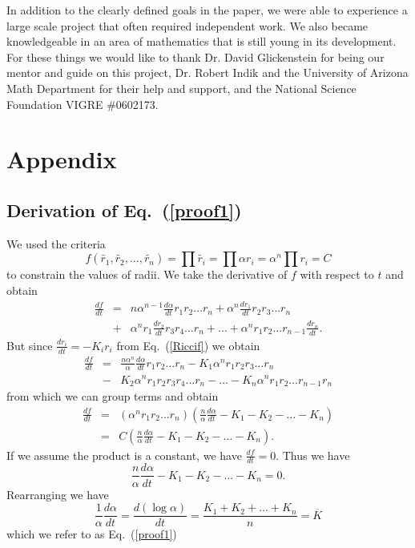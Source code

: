 \documentclass[12pt]{article}
\begin{document}
\noindent In addition to the clearly defined goals in the paper, we were able to experience a large scale project that often required independent work. We also became knowledgeable in an area of mathematics that is still young in its development. For these things we would like to thank Dr. David Glickenstein for being our mentor and guide on this project, Dr. Robert Indik and the University of Arizona Math Department for their help and support, and the National Science Foundation VIGRE $\#$0602173.

\newpage
  


\newpage
\section{Appendix}

\subsection{Derivation of Eq.~(\ref{proof1})}
\maketitle
	
	We used the criteria $$f(\tilde{r_1},\tilde{r_2},\ldots,\tilde{r_n}) = \prod{\tilde{r_i}} = \prod{\alpha r_i} = \alpha^n\prod{r_i}= C$$ to constrain the values of radii. We take the derivative of $f$ with respect to $t$ and obtain
	\begin{eqnarray*}
	\frac{df}{dt} & = & n\alpha^{n-1}\frac{d\alpha}{dt}r_1r_2\ldots r_n + \alpha^n\frac{dr_1}{dt}r_2r_3\ldots r_n\\
								& + & \alpha^nr_1\frac{dr_2}{dt}r_3r_4\ldots r_n + \ldots + \alpha^nr_1r_2\ldots r_{n-1}\frac{dr_n}{dt}.
	\end{eqnarray*}
	But since $\displaystyle \frac{dr_i}{dt} = -K_ir_i$ from Eq.~(\ref{Riccif}) we obtain
	\begin{eqnarray*}
	\frac{df}{dt} & = & \frac{n\alpha^{n}}{\alpha}\frac{d\alpha}{dt}r_1r_2\ldots r_n - K_1\alpha^nr_1r_2r_3\ldots r_n\\
								& - & K_2\alpha^nr_1r_2r_3r_4\ldots r_n - \ldots - K_n\alpha^nr_1r_2\ldots r_{n-1}r_n
	\end{eqnarray*}
	from which we can group terms and obtain
	\begin{eqnarray*}
	\frac{df}{dt} & = & (\alpha^nr_1r_2\ldots r_n)(\frac{n}{\alpha}\frac{d\alpha}{dt} - K_1 - K_2 - \ldots - K_n)\\
								& = & C(\frac{n}{\alpha}\frac{d\alpha}{dt} - K_1 - K_2 - \ldots - K_n).
	\end{eqnarray*}
	If we assume the product is a constant, we have $\displaystyle \frac{df}{dt} = 0.$ Thus we have $$\frac{n}{\alpha}\frac{d\alpha}{dt} - K_1 - K_2 - \ldots - K_n = 0.$$
	Rearranging we have
$$\frac{1}{\alpha}\frac{d\alpha}{dt} = \frac{d(\log \alpha)}{dt} = \frac{K_1 + K_2 + \ldots + K_n}{n} = \overline{K}$$
	which we refer to as Eq.~(\ref{proof1})
  
\end{document}

